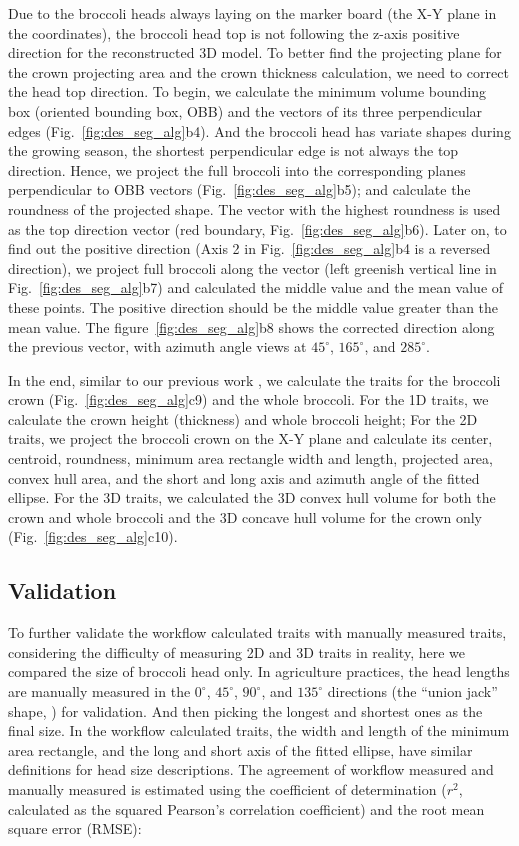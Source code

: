 Due to the broccoli heads always laying on the marker board (the X-Y plane in the coordinates), the broccoli head top is not following the z-axis positive direction for the reconstructed 3D model. To better find the projecting plane for the crown projecting area and the crown thickness calculation, we need to correct the head top direction. To begin, we calculate the minimum volume bounding box (oriented bounding box, OBB) and the vectors of its three perpendicular edges (Fig.~\ref{fig:des_seg_alg}b4). And the broccoli head has variate shapes during the growing season, the shortest perpendicular edge is not always the top direction. Hence, we project the full broccoli into the corresponding planes perpendicular to OBB vectors (Fig.~\ref{fig:des_seg_alg}b5); and calculate the roundness of the projected shape. The vector with the highest roundness is used as the top direction vector (red boundary, Fig.~\ref{fig:des_seg_alg}b6). Later on, to find out the positive direction (Axis 2 in Fig.~\ref{fig:des_seg_alg}b4 is a reversed direction), we project full broccoli along the vector (left greenish vertical line in Fig.~\ref{fig:des_seg_alg}b7) and calculated the middle value and the mean value of these points. The positive direction should be the middle value greater than the mean value. The figure~\ref{fig:des_seg_alg}b8 shows the corrected direction along the previous vector, with azimuth angle views at $45^\circ$, $165^\circ$, and $285^\circ$.

In the end, similar to our previous work \citep{feldman_easydcp_2021}, we calculate the traits for the broccoli crown (Fig.~\ref{fig:des_seg_alg}c9) and the whole broccoli. For the 1D traits, we calculate the crown height (thickness) and whole broccoli height; For the 2D traits, we project the broccoli crown on the X-Y plane and calculate its center, centroid, roundness, minimum area rectangle width and length, projected area, convex hull area, and the short and long axis and azimuth angle of the fitted ellipse. For the 3D traits, we calculated the 3D convex hull volume for both the crown and whole broccoli and the 3D concave hull volume for the crown only (Fig.~\ref{fig:des_seg_alg}c10).

\subsection{Validation}

To further validate the workflow calculated traits with manually measured traits, considering the difficulty of measuring 2D and 3D traits in reality, here we compared the size of broccoli head only. In agriculture practices, the head lengths are manually measured in the $0^\circ$, $45^\circ$, $90^\circ$, and $135^\circ$ directions (the ``union jack'' shape, ) for validation. And then picking the longest and shortest ones as the final size. In the workflow calculated traits, the width and length of the minimum area rectangle, and the long and short axis of the fitted ellipse, have similar definitions for head size descriptions. The agreement of workflow measured and manually measured is estimated using the coefficient of determination ($r^2$, calculated as the squared Pearson's correlation coefficient) and the root mean square error (RMSE):

